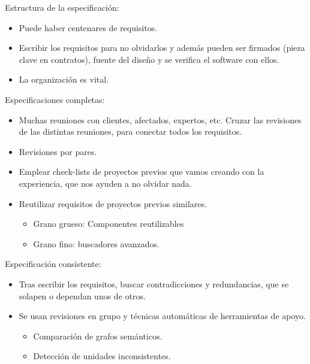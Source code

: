 \documentclass[12pt, twoside, openright]{report} %
\begin{document}
	Estructura de la especificación:

    \begin{itemize}
    
    \item
      Puede haber centenares de requisitos.
    \item
      Escribir los requisitos para no olvidarlos y además pueden ser
      firmados (pieza clave en contratos), fuente del diseño y se
      verifica el software con ellos.
    \item
      La organización es vital.
    \end{itemize}

	Especificaciones completas:

    \begin{itemize}
    
    \item
      Muchas reuniones con clientes, afectados, expertos, etc. Cruzar
      las revisiones de las distintas reuniones, para conectar todos los
      requisitos.
    \item
      Revisiones por pares.
    \item
      Emplear check-lists de proyectos previos que vamos creando con la
      experiencia, que nos ayuden a no olvidar nada.
    \item
      Reutilizar requisitos de proyectos previos similares.

      \begin{itemize}
      
      \item
        Grano grueso: Componentes reutilizables
      \item
        Grano fino: buscadores avanzados.
      \end{itemize}
    \end{itemize}

	Especificación consistente:

    \begin{itemize}
    
    \item
      Tras escribir los requisitos, buscar contradicciones y
      redundancias, que se solapen o dependan unos de otros.
    \item
      Se usan revisiones en grupo y técnicas automáticas de herramientas
      de apoyo.

      \begin{itemize}
      
      \item
        Comparación de grafos semánticos.
      \item
        Detección de unidades inconsistentes.
      \end{itemize}
    \end{itemize}
\end{document}
